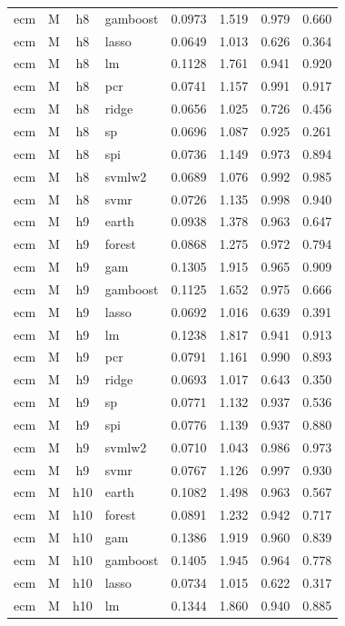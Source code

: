 \begin{ThreePartTable}
\begin{longtable}[t]{llclcccc}
ecm & M & h8 & gamboost & 0.0973 & 1.519 & 0.979 & 0.660\\
ecm & M & h8 & lasso & 0.0649 & 1.013 & 0.626 & 0.364\\
ecm & M & h8 & lm & 0.1128 & 1.761 & 0.941 & 0.920\\
ecm & M & h8 & pcr & 0.0741 & 1.157 & 0.991 & 0.917\\
ecm & M & h8 & ridge & 0.0656 & 1.025 & 0.726 & 0.456\\
ecm & M & h8 & sp & 0.0696 & 1.087 & 0.925 & 0.261\\
ecm & M & h8 & spi & 0.0736 & 1.149 & 0.973 & 0.894\\
ecm & M & h8 & svmlw2 & 0.0689 & 1.076 & 0.992 & 0.985\\
ecm & M & h8 & svmr & 0.0726 & 1.135 & 0.998 & 0.940\\
\addlinespace
ecm & M & h9 & earth & 0.0938 & 1.378 & 0.963 & 0.647\\
ecm & M & h9 & forest & 0.0868 & 1.275 & 0.972 & 0.794\\
ecm & M & h9 & gam & 0.1305 & 1.915 & 0.965 & 0.909\\
ecm & M & h9 & gamboost & 0.1125 & 1.652 & 0.975 & 0.666\\
ecm & M & h9 & lasso & 0.0692 & 1.016 & 0.639 & 0.391\\
ecm & M & h9 & lm & 0.1238 & 1.817 & 0.941 & 0.913\\
ecm & M & h9 & pcr & 0.0791 & 1.161 & 0.990 & 0.893\\
ecm & M & h9 & ridge & 0.0693 & 1.017 & 0.643 & 0.350\\
ecm & M & h9 & sp & 0.0771 & 1.132 & 0.937 & 0.536\\
ecm & M & h9 & spi & 0.0776 & 1.139 & 0.937 & 0.880\\
ecm & M & h9 & svmlw2 & 0.0710 & 1.043 & 0.986 & 0.973\\
ecm & M & h9 & svmr & 0.0767 & 1.126 & 0.997 & 0.930\\
\addlinespace
ecm & M & h10 & earth & 0.1082 & 1.498 & 0.963 & 0.567\\
ecm & M & h10 & forest & 0.0891 & 1.232 & 0.942 & 0.717\\
ecm & M & h10 & gam & 0.1386 & 1.919 & 0.960 & 0.839\\
ecm & M & h10 & gamboost & 0.1405 & 1.945 & 0.964 & 0.778\\
ecm & M & h10 & lasso & 0.0734 & 1.015 & 0.622 & 0.317\\
ecm & M & h10 & lm & 0.1344 & 1.860 & 0.940 & 0.885\\

\end{longtable}
\end{ThreePartTable}
